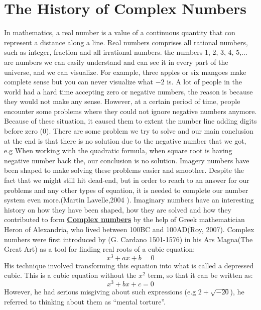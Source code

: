 \documentclass[11pt]{report}
\newcommand{\ubt}[1]{\textbf{\underline{#1}}}
\begin{document}
	\section{The History of Complex Numbers}
	In mathematics, a real number is a value of a continuous quantity that con represent a distance along a line. Real numbers comprises all rational numbers, such as integer, fraction and all irrational numbers. the numbers 1, 2, 3, 4, 5,$\ldots$ are numbers we can easily understand and can see it in every part of the universe, and we can visualize. For example, three apples or six mangoes make complete sense but you can never visualize what $-2$ is. A lot of people in the world had a hard time accepting zero or negative numbers, the reason is because they would not make any sense. However, at a certain period of time, people encounter some problems where they could not ignore negative numbers anymore. Because of these situation, it caused them to extent the number line adding digits before zero (0). There are some problem we try to solve and our main conclusion at the end is that there is no solution due to the negative number that we got, e.g When working with the quadratic formula, when square root is having negative number back the, our conclusion is no solution. Imagery numbers have been shaped to make solving these problems easier and smoother. Despite the fact that we might still hit dead-end, but in order to reach to an answer for our problems and any other types of equation, it is needed to complete our number system even more.(Martin Lavelle,2004 ). Imaginary numbers have an interesting history on how they have been shaped, how they are solved and how they contributed to form \ubt{Complex numbers} by the help of Greek mathematician Heron of Alexandria, who lived between 100BC and 100AD(Roy, 2007). Complex numbers were first introduced by (G. Cardano  1501-1576) in his Ars Magna(The Great Art) as a tool for finding real roots of a cubic equation:
	\begin{equation}
		x^3+ax+b=0\label{eq:1_1}
	\end{equation}
	His technique involved transforming this equation into what is called a depressed cubic. This is a cubic equation without the $x^2$ term, so that it can be written as:
	\begin{equation}
		x^3 +bx + c = 0\label{eq:1_2}
	\end{equation}
	However, he had serious misgiving about such expressions (e.g $2+\sqrt{-20}$), he referred to thinking about them as ``mental torture''.\\
	
\end{document}
